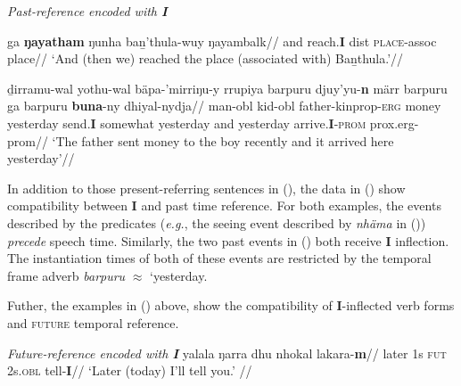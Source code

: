 \pex \textit{Past-reference encoded with \textbf{I}}



\a{}\begingl\gla ga \textbf{ŋayatham} ŋunha baṉ'thula-wuy ŋayambalk//
\glb and reach.\textbf{I} \gls{dist} \textsc{place}-\gls{assoc} place//
\glft`And (then we) reached the place (associated with) Baṉthula.'//\endgl



\a{}\begingl\gla ḏirramu-wal yothu-wal bäpa-'mirriŋu-y rrupiya barpuru djuy'yu-\textbf{n} märr barpuru ga barpuru \textbf{buna}-ny dhiyal-nydja//
\glb man-\gls{obl} kid-\gls{obl} father-\gls{kinprop}-\textsc{erg} money yesterday send.\textbf{I} somewhat yesterday and yesterday arrive.\textbf{I}-\textsc{prom} \gls{prox}.\gls{erg}-\gls{prom}//
\glft`The father sent money to the boy recently and it arrived here yesterday'//\endgl

\xe

In addition to those present-referring sentences in (\blastx), the data in () show compatibility between \textbf{I} and past time reference. For both examples, the events described by the predicates (\textit{e.g.}, the seeing event described by \textit{nhäma} in ()) \textit{precede} speech time. Similarly, the two past events in () both receive \textbf{I} inflection. The instantiation times of both of these events are restricted by the temporal frame adverb \textit{barpuru} $\approx$ `yesterday.%

Futher, the examples in () above, show the compatibility of \textbf{I}-inflected verb forms and \textsc{future }temporal reference.

\pex {} \textit{Future-reference encoded with \textbf{I}}
\a{}\begingl\gla yalala ŋarra dhu nhokal lakara-\textbf{m}//
\glb later 1s \textsc{fut} 2s\textsc{.obl} tell-\textbf{I}//
\glft `Later (today) I'll tell you.' //\endgl

